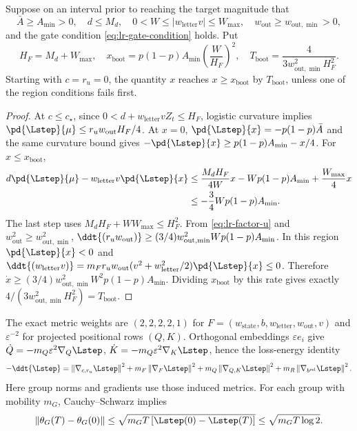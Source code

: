 \begin{lemma}
\label{lem:lr-feature-bootstrap}
Suppose on an interval prior to reaching the target magnitude that
\begin{equation}\label{eq:lr-amplification-region}
 \bar A\ge A_{\min}>0,\quad
 d\le M_d,\quad
 0<W\le|{w_{\mathrm{letter}} v}|\le W_{\max},\quad
 w_{\mathrm{out}}\ge w_{\mathrm{out},\min}>0,
\end{equation}
and the gate condition \eqref{eq:lr-gate-condition} holds.  Put
\begin{equation}\label{eq:lr-gamma-bootstrap}
 H_F=M_d+W_{\max},\quad
 x_{\mathrm{boot}}=p(1-p) A_{\min}\left(\frac W{H_F}\right)^2,
 \quad
 T_{\mathrm{boot}}=\frac4{3w_{\mathrm{out},\min}^2H_F^2}.
\end{equation}
Starting with $c=r_u=0$, the quantity $x$ reaches $x\ge x_{\mathrm{boot}}$
by $T_{\mathrm{boot}}$, unless one of the region conditions fails first.
\end{lemma}
\begin{proof}
At $c\le c_\star$, since
$0<d+{w_{\mathrm{letter}} v} Z_t\le H_F$, logistic curvature implies
$\pd{\Lstep}{\mu}\le{r_uw_{\mathrm{out}}} H_F/4$.  At $x=0$, $\pd{\Lstep}{x}=-p(1-p)\bar A$ and the
same curvature bound gives $-\pd{\Lstep}{x}\ge p(1-p) A_{\min}-x/4$.
For $x\le x_{\mathrm{boot}}$,
\begin{align*}
 d\pd{\Lstep}{\mu}-w_{\mathrm{letter}} v\pd{\Lstep}{x}
 &\le\frac{M_dH_F}{4W}x-Wp(1-p)A_{\min}+\frac{W_{\max}}4x\\
 &\le-\frac34Wp(1-p)A_{\min}.
\end{align*}
The last step uses
$M_d H_F+WW_{\max}\le H_F^2$.
From \eqref{eq:lr-factor-u} and
$w_{\mathrm{out}}^2\ge w_{\mathrm{out},\min}^2$,
$\ddt{(r_uw_{\mathrm{out}})}\ge(3/4)w_{\mathrm{out},\min}^2Wp(1-p) A_{\min}$.
In this region $\pd{\Lstep}{x}<0$ and
$\ddt{(w_{\mathrm{letter}} v)}=m_F{r_uw_{\mathrm{out}}}(v^2+w_{\mathrm{letter}}^2/2)\pd{\Lstep}{x}\le0$.
Therefore
$\dot x\ge(3/4)w_{\mathrm{out},\min}^2W^2p(1-p)A_{\min}$.
Dividing $x_{\mathrm{boot}}$ by this rate gives exactly
$4/(3w_{\mathrm{out},\min}^2H_F^2)=T_{\mathrm{boot}}$.
\end{proof}

The exact metric weights are $(2,2,2,2,1)$ for
$F=(w_{\mathrm{state}},b,w_{\mathrm{letter}},w_{\mathrm{out}},v)$ and
$\varepsilon^{-2}$ for projected positional rows $(Q,K)$.
Orthogonal embeddings $\varepsilon e_i$ give
$\dot Q=-m_Q\varepsilon^2\nabla_Q\Lstep$,
$\dot K=-m_Q\varepsilon^2\nabla_K\Lstep$, hence the loss-energy identity
\begin{equation}\label{eq:lr-mobility-budget}
 -\ddt{\Lstep}=
 \LRnorm{\nabla_{c,r_u}\Lstep}^2
 +m_F\LRnorm{\nabla_F\Lstep}^2
 +m_Q\LRnorm{\nabla_{Q,K}\Lstep}^2
 +m_R\LRnorm{\nabla_{b^{\mathrm{rel}}}\Lstep}^2.
\end{equation}
Here group norms and gradients use those induced metrics. For each group
with mobility $m_G$, Cauchy--Schwarz implies
\begin{equation}\label{eq:lr-movement-budget}
 \LRnorm{\theta_G(T)-\theta_G(0)}
 \le\sqrt{m_G T\,[\Lstep(0)-\Lstep(T)]}
 \le\sqrt{m_G T\log2}.
\end{equation}


